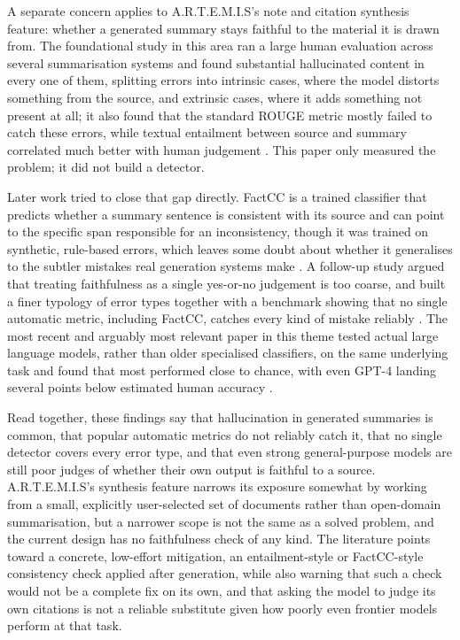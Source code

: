 \documentclass[11pt,a4paper]{report}
\newcommand{\artemis}{A.R.T.E.M.I.S}
\begin{document}
A separate concern applies to \artemis{}'s note and citation synthesis
feature: whether a generated summary stays faithful to the material it
is drawn from. The foundational study in this area ran a large human
evaluation across several summarisation systems and found substantial
hallucinated content in every one of them, splitting errors into
intrinsic cases, where the model distorts something from the source,
and extrinsic cases, where it adds something not present at all; it
also found that the standard ROUGE metric mostly failed to catch these
errors, while textual entailment between source and summary
correlated much better with human judgement
\autocite{maynez2020faithfulness}. This paper only measured the
problem; it did not build a detector.

Later work tried to close that gap directly. FactCC is a trained
classifier that predicts whether a summary sentence is consistent with
its source and can point to the specific span responsible for an
inconsistency, though it was trained on synthetic, rule-based errors,
which leaves some doubt about whether it generalises to the subtler
mistakes real generation systems make \autocite{kryscinski2020evaluating}.
A follow-up study argued that treating faithfulness as a single
yes-or-no judgement is too coarse, and built a finer typology of error
types together with a benchmark showing that no single automatic
metric, including FactCC, catches every kind of mistake reliably
\autocite{pagnoni2021understanding}. The most recent and arguably most
relevant paper in this theme tested actual large language models,
rather than older specialised classifiers, on the same underlying task
and found that most performed close to chance, with even GPT-4
landing several points below estimated human accuracy
\autocite{laban2023summedits}.

Read together, these findings say that hallucination in generated
summaries is common, that popular automatic metrics do not reliably
catch it, that no single detector covers every error type, and that
even strong general-purpose models are still poor judges of whether
their own output is faithful to a source. \artemis{}'s synthesis
feature narrows its exposure somewhat by working from a small,
explicitly user-selected set of documents rather than open-domain
summarisation, but a narrower scope is not the same as a solved
problem, and the current design has no faithfulness check of any
kind. The literature points toward a concrete, low-effort mitigation,
an entailment-style or FactCC-style consistency check applied after
generation, while also warning that such a check would not be a
complete fix on its own, and that asking the model to judge its own
citations is not a reliable substitute given how poorly even frontier
models perform at that task.
\end{document}
